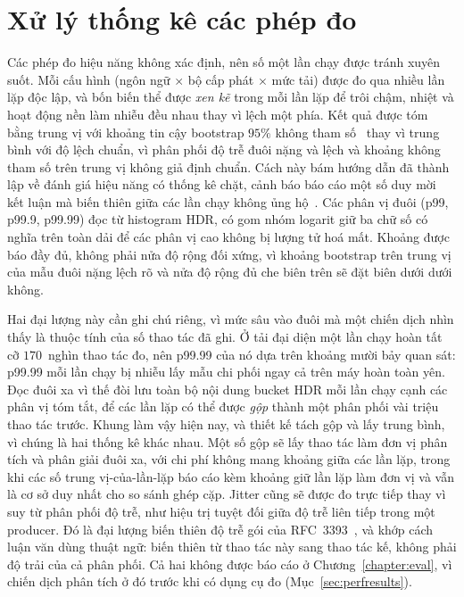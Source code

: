 \section{Xử lý thống kê các phép đo}\label{sec:stats}
Các phép đo hiệu năng không xác định, nên số một lần chạy được tránh xuyên suốt. Mỗi cấu hình
(ngôn ngữ $\times$ bộ cấp phát $\times$ mức tải) được đo qua nhiều lần lặp độc lập, và bốn biến
thể được \emph{xen kẽ} trong mỗi lần lặp để trôi chậm, nhiệt và hoạt động nền làm nhiễu đều nhau
thay vì lệch một phía. Kết quả được tóm bằng trung vị với khoảng tin cậy bootstrap $95\%$
không tham số~\cite{efron1993bootstrap} thay vì trung bình với độ lệch chuẩn, vì phân phối độ
trễ đuôi nặng và lệch và khoảng không tham số trên trung vị không giả định chuẩn. Cách này bám
hướng dẫn đã thành lập về đánh giá hiệu năng có thống kê chặt, cảnh báo báo cáo một số duy mời
kết luận mà biến thiên giữa các lần chạy không ủng hộ~\cite{georges2007rigorous}. Các phân vị đuôi
(p99, p99.9, p99.99) đọc từ histogram HDR, có gom nhóm logarit giữ ba chữ số có nghĩa trên toàn
dải để các phân vị cao không bị lượng tử hoá mất. Khoảng được báo đầy đủ, không phải nửa độ rộng
đối xứng, vì khoảng bootstrap trên trung vị của mẫu đuôi nặng lệch rõ và nửa độ rộng đủ che biên
trên sẽ đặt biên dưới dưới không.

Hai đại lượng này cần ghi chú riêng, vì mức sâu vào đuôi mà một chiến dịch nhìn thấy là thuộc tính
của số thao tác đã ghi. Ở tải đại diện một lần chạy hoàn tất cỡ $170$~nghìn thao tác đo, nên
p99.99 của nó dựa trên khoảng mười bảy quan sát: p99.99 mỗi lần chạy bị nhiễu lấy mẫu chi phối
ngay cả trên máy hoàn toàn yên. Đọc đuôi xa vì thế đòi lưu toàn bộ nội dung bucket HDR mỗi lần
chạy cạnh các phân vị tóm tắt, để các lần lặp có thể được \emph{gộp} thành một phân phối vài
triệu thao tác trước. Khung làm vậy hiện nay, và thiết kế tách gộp và lấy trung bình, vì chúng
là hai thống kê khác nhau. Một số gộp sẽ lấy thao tác làm đơn vị phân tích và phân giải đuôi xa,
với chi phí không mang khoảng giữa các lần lặp, trong khi các số trung vị-của-lần-lặp báo cáo
kèm khoảng giữ lần lặp làm đơn vị và vẫn là cơ sở duy nhất cho so sánh ghép cặp. Jitter cũng sẽ
được đo trực tiếp thay vì suy từ phân phối độ trễ, như hiệu trị tuyệt đối giữa độ trễ liên tiếp
trong một producer. Đó là đại lượng biến thiên độ trễ gói của RFC~3393~\cite{rfc3393}, và khớp
cách luận văn dùng thuật ngữ: biến thiên từ thao tác này sang thao tác kế, không phải độ trải của
cả phân phối. Cả hai không được báo cáo ở Chương~\ref{chapter:eval}, vì chiến dịch phân tích ở đó
trước khi có dụng cụ đo (Mục~\ref{sec:perfresults}).

